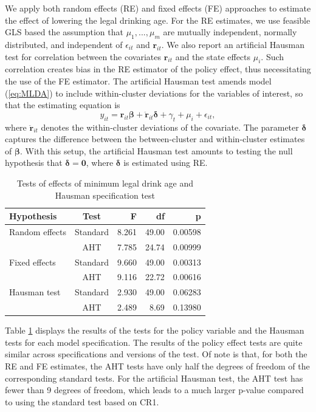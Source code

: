 \documentclass[12pt]{article}\usepackage[]{graphicx}\usepackage[]{color}
\newcommand{\bm}{\mathbf}
\newcommand{\bs}{\boldsymbol}
\begin{document}
We apply both random effects (RE) and fixed effects (FE) approaches to estimate the effect of lowering the legal drinking age. 
For the RE estimates, we use feasible GLS based the assumption that  $\mu_1,...,\mu_m$ are mutually independent, normally distributed, and independent of $\epsilon_{it}$ and $\bm{r}_{it}$.
We also report an artificial Hausman test \citep{Arellano1993on, Wooldridge2010econometric} for correlation between the covariates $\bm{r}_{it}$ and the state effects $\mu_i$. Such correlation creates bias in the RE estimator of the policy effect, thus necessitating the use of the FE estimator.
The artificial Hausman test amends model (\ref{eq:MLDA}) to include within-cluster deviations for the variables of interest, so that the estimating equation is
\begin{equation}
y_{it} = \bm{r}_{it}\bs\beta + \bm{\ddot{r}}_{it}\bs\delta + \gamma_t + \mu_i + \epsilon_{it},
\end{equation}
where $\bm{\ddot{r}}_{it}$ denotes the within-cluster deviations of the covariate.
The parameter $\bs\delta$ captures the difference between the between-cluster and within-cluster estimates of $\bs\beta$. 
With this setup, the artificial Hausman test amounts to testing the null hypothesis that $\bs\delta = \bm{0}$, where $\bs\delta$ is estimated using RE.  



\begin{table}[bth]
\centering
\caption{Tests of effects of minimum legal drink age and Hausman specification test} 
\label{tab:MLDA}
\begin{tabular}{lcrrr}
  \toprule
Hypothesis & Test & F & df & p \\ 
  \midrule
Random effects & Standard & 8.261 & 49.00 & 0.00598 \\ 
   & AHT & 7.785 & 24.74 & 0.00999 \\ 
  Fixed effects & Standard & 9.660 & 49.00 & 0.00313 \\ 
   & AHT & 9.116 & 22.72 & 0.00616 \\ 
   \midrule
Hausman test & Standard & 2.930 & 49.00 & 0.06283 \\ 
   & AHT & 2.489 & 8.69 & 0.13980 \\ 
   \bottomrule
\end{tabular}
\end{table}


Table \ref{tab:MLDA} displays the results of the tests for the policy variable and the Hausman tests for each model specification. 
The results of the policy effect tests are quite similar across specifications and versions of the test. 
Of note is that, for both the RE and FE estimates, the AHT tests have only half the degrees of freedom of the corresponding standard tests. 
For the artificial Hausman test, the AHT test has fewer than 9 degrees of freedom, which leads to a much larger p-value compared to using the standard test based on CR1. 
\end{document}
